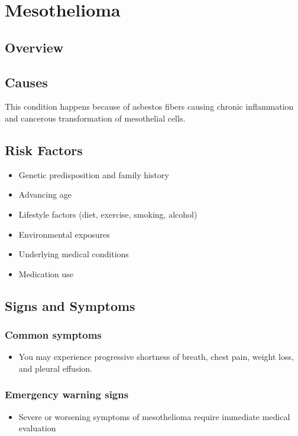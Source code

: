 \chapter{Mesothelioma}
\label{sec:Mesothelioma}

\section{Overview}

\section{Causes}
This condition happens because of asbestos fibers causing chronic inflammation and cancerous transformation of mesothelial cells.     
\section{Risk Factors}

\begin{itemize}[noitemsep]
  \item Genetic predisposition and family history
  \item Advancing age
  \item Lifestyle factors (diet, exercise, smoking, alcohol)
  \item Environmental exposures
  \item Underlying medical conditions
  \item Medication use
\end{itemize}
\section{Signs and Symptoms}

\subsection{Common symptoms}
\begin{itemize}[noitemsep]
  \item You may experience progressive shortness of breath, chest pain, weight loss, and pleural effusion. 
  \end{itemize}

\subsection{Emergency warning signs}
\begin{itemize}[noitemsep]
  \item Severe or worsening symptoms of mesothelioma require immediate medical evaluation
\end{itemize}
